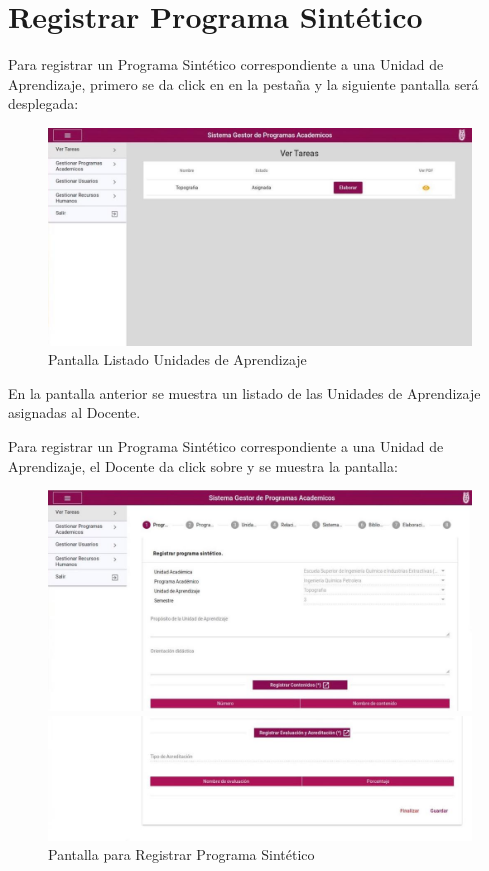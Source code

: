\section{Registrar Programa Sintético}
Para registrar un Programa Sintético correspondiente a una Unidad de Aprendizaje, primero se da click en en la pestaña  y la siguiente pantalla será desplegada:

\begin{figure}[!hbtp]
    \centering
    \hypertarget{RegLUA}{\includegraphics[width=0.7\linewidth]{images/SP6/PSListado.jpeg}}
    \caption{Pantalla Listado Unidades de Aprendizaje} 
\end{figure}

En la pantalla anterior se muestra un listado de las Unidades de Aprendizaje asignadas al Docente.

Para registrar un Programa Sintético correspondiente a una Unidad de Aprendizaje, el Docente da click sobre  y se muestra la pantalla:

\pagebreak
\begin{figure}[!hbtp]
    \centering
    \hypertarget{RegPS}{\includegraphics[width=0.7\linewidth]{images/SP6/PSinicio.jpeg}}
    \includegraphics[width=0.7\linewidth]{images/SP6/PSinicio2.jpeg}
    \caption{Pantalla para Registrar Programa Sintético}
\end{figure}

